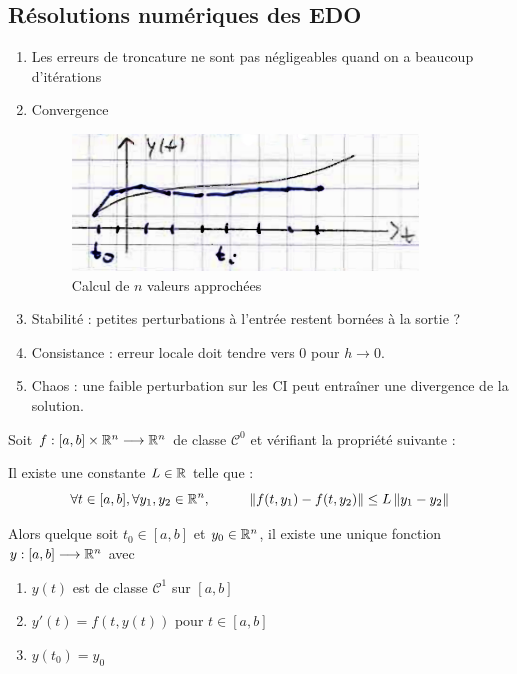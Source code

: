\subsection*{Résolutions numériques des EDO}
\begin{enumerate}[label=*]
    \item Les erreurs de troncature ne sont pas négligeables quand on a beaucoup d'itérations
    \item Convergence
        \begin{figure}[h]
            \centering
            \includegraphics[scale=0.5]{5-EDO-cvgence.png}
            \caption{Calcul de $n$ valeurs approchées}
        \end{figure}
    \item Stabilité : petites perturbations à l'entrée restent bornées à la sortie ?
    \item Consistance : erreur locale doit tendre vers 0 pour $h \to 0$.
    \item Chaos : une faible perturbation sur les CI peut entraîner une divergence de la solution.
\end{enumerate}

\begin{ftheo}
    Soit $f : [a,b] \times \mathbb{R}^n \longrightarrow \mathbb{R}^n$ de classe $\mathcal{C}^0$ et vérifiant
    la propriété suivante :

    Il existe une constante $L \in \mathbb{R}$ telle que :
        \begin{equation*}
            \forall t \in [a,b], \forall y_1, y_2 \in \mathbb{R}^n, \hspace{1cm} \left\lVert f(t,y_1) - f(t,y_2)\right\rVert \leq L \left\lVert y_1 - y_2\right\rVert
        \end{equation*}

        Alors quelque soit $t_0 \in [a,b]$ et $y_0 \in \mathbb{R}^n$, il existe une unique fonction
        $y : [a,b] \longrightarrow \mathbb{R}^n$ avec
    \begin{enumerate}[label=(\roman*)]
        \item $y(t)$ est de classe $\mathcal{C}^1$ sur $[a,b]$
        \item $y'(t) = f(t,y(t))$ pour $t \in [a,b]$
        \item $y(t_0) = y_0$
    \end{enumerate}
\end{ftheo}

